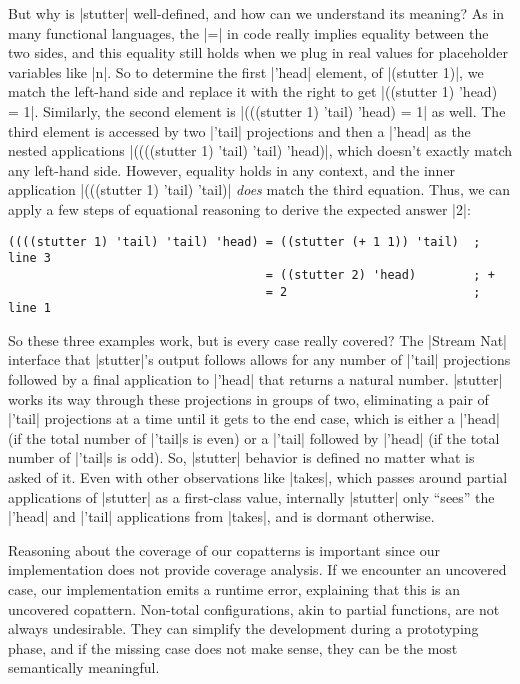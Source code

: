 But why is \scm|stutter| well-defined, and how can we understand its meaning?
As in many functional languages, the \scm|=| in code really implies equality between the two sides, and this equality still holds when we plug in real values for placeholder variables like \scm|n|.
So to determine the first \scm|'head| element, of \scm|(stutter 1)|, we match the left-hand side and replace it with the right to get \scm|((stutter 1) 'head) = 1|.
Similarly, the second element is \scm|(((stutter 1) 'tail) 'head) = 1| as well.
The third element is accessed by two \scm|'tail| projections and then a \scm|'head| as the nested applications \scm|((((stutter 1) 'tail) 'tail) 'head)|, which doesn't exactly match any left-hand side.
However, equality holds in any context, and the inner application \scm|(((stutter 1) 'tail) 'tail)| \emph{does} match the third equation.
Thus, we can apply a few steps of equational reasoning to derive the expected answer \scm|2|:
\begin{verbatim}
((((stutter 1) 'tail) 'tail) 'head) = ((stutter (+ 1 1)) 'tail)  ; line 3
                                    = ((stutter 2) 'head)        ; +
                                    = 2                          ; line 1
\end{verbatim}
So these three examples work, but is every case really covered?
The \scm|Stream Nat| interface that \scm|stutter|'s output follows allows for any number of \scm|'tail| projections followed by a final application to \scm|'head| that returns a natural number.
\scm|stutter| works its way through these projections in groups of two, eliminating a pair of \scm|'tail| projections at a time until it gets to the end case, which is either a \scm|'head| (if the total number of \scm|'tail|s is even) or a \scm|'tail| followed by \scm|'head| (if the total number of \scm|'tail|s is odd).
So, \scm|stutter| behavior is defined no matter what is asked of it.
Even with other observations like \scm|takes|, which passes around partial applications of \scm|stutter| as a first-class value, internally \scm|stutter| only ``sees'' the \scm|'head| and \scm|'tail| applications from \scm|takes|, and is dormant otherwise.

Reasoning about the coverage of our copatterns is important since our implementation does not provide coverage analysis.
If we encounter an uncovered case, our implementation emits a runtime error, explaining that this is an uncovered copattern.
Non-total configurations, akin to partial functions, are not always undesirable. They can simplify the development during a prototyping phase, and if the missing case does not make sense, they can be the most semantically meaningful.

